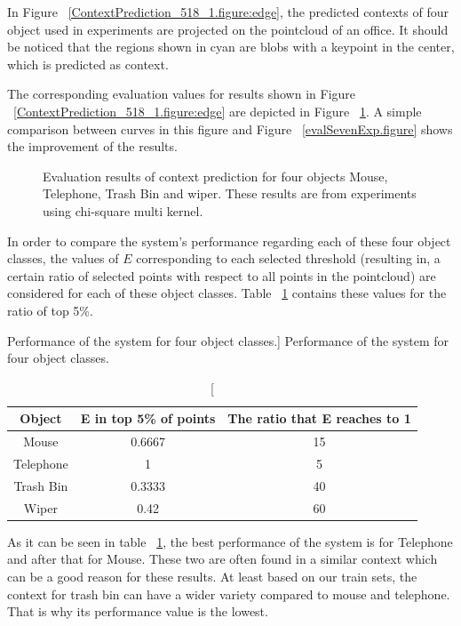 In Figure ~\ref{ContextPrediction_518_1.figure:edge}, the predicted contexts of four object used in experiments 
are projected on the pointcloud of an office.
It should be noticed that the regions shown in cyan are blobs with a keypoint in the center, which is predicted as 
context.

The corresponding evaluation values for results shown in Figure ~\ref{ContextPrediction_518_1.figure:edge} are depicted
in Figure ~\ref{Eval_518_1.figure}.
A simple comparison between curves in this figure and Figure ~\ref{evalSevenExp.figure} shows the improvement of the 
results.

\begin{figure}
  \begin{center}
  \caption[Evaluation results for four object classes.]
  {Evaluation results of context prediction for four objects Mouse, Telephone, Trash Bin and wiper. These results are from experiments using chi-square multi kernel.}
  \label{Eval_518_1.figure}
  \end{center}
\end{figure}

In order to compare the system's performance regarding each of these four object classes, the values of $E$ corresponding to each selected threshold (resulting in, a certain ratio of selected points with respect to all points in the pointcloud) are considered for each of these object classes.
Table ~\ref{performance.table} contains these values for the ratio of top 5\%.

\begin{table}
\centering
\caption
[Performance of the system for four object classes.]
{Performance of the system for four object classes.}
\label{performance.table}
\begin{tabular}{|c|c|c|}
\hline
Object & E in top 5\% of points & The ratio that E reaches to 1 \\
\hline
      Mouse & 0.6667 & 15 \\
\hline
      Telephone & 1 & 5 \\
\hline
      Trash Bin & 0.3333 &  40\\
\hline
      Wiper & 0.42 & 60 \\
\hline
\end{tabular}
\end{table}

As it can be seen in table ~\ref{performance.table}, the best performance of the system is for Telephone and after 
that for Mouse.
These two are often found in a similar context which can be a good reason for these results.
At least based on our train sets, the context for trash bin can have a wider variety compared to mouse and telephone.
That is why its performance value is the lowest.


